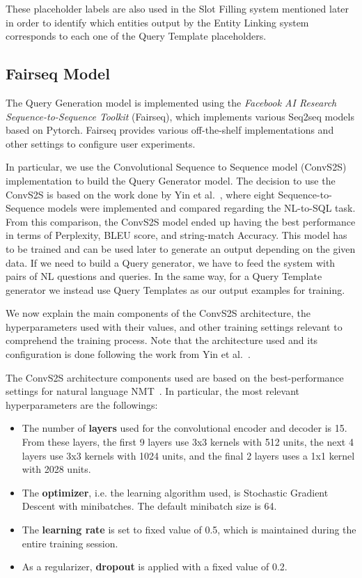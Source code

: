 These placeholder labels are also used in the Slot Filling system mentioned later in order to 
identify which entities output by the Entity Linking system corresponds to each one of the 
Query Template placeholders. 

\subsection{Fairseq Model}
\label{cap3:system/queryGenModule/fairseqModel}
The Query Generation model is implemented using the \textit{Facebook AI Research Sequence-to-Sequence 
Toolkit} (Fairseq), which implements various Seq2seq models based on Pytorch. Fairseq 
provides various off-the-shelf implementations and other settings to configure user 
experiments. 

In particular, we use the Convolutional Sequence to Sequence model (ConvS2S)~\cite{nmt:convS2S-GehringAGYD17} 
implementation to build the Query Generator model. The decision to use the ConvS2S is based 
on the work done by Yin et al.~\cite{nmt:nl-to-sparql-Yin19}, where eight Sequence-to-Sequence 
models were implemented and compared regarding the NL-to-SQL task. From this comparison, 
the ConvS2S model ended up having the best performance in terms of Perplexity, BLEU score, 
and string-match Accuracy. This model has to be trained and can be used later to generate an 
output depending on the given data. If we need to build a \SPARQL{} Query generator, we have to 
feed the system with pairs of NL questions and \SPARQL{} queries. In the same way, for a Query 
Template generator we instead use Query Templates as our output examples for training.

We now explain the main components of the ConvS2S architecture, the hyperparameters used with 
their values, and other training settings relevant to comprehend the training process. Note 
that the architecture used and its configuration is done following the work from 
Yin et al.~\cite{nmt:nl-to-sparql-Yin19}.

The ConvS2S architecture components used are based on the best-performance settings for 
natural language NMT~\cite{nmt:nl-to-sparql-Yin19}. In particular, the most relevant 
hyperparameters are the followings:

\begin{itemize}
    \item The number of \textbf{layers} used for the convolutional encoder and decoder is 15. 
    From these layers, the first 9 layers use 3x3 kernels with 512 units, the next 4 layers 
    use 3x3 kernels with 1024 units, and the final 2 layers uses a 1x1 kernel with 2028 units.
    \item The \textbf{optimizer}, i.e. the learning algorithm used, is Stochastic Gradient 
    Descent with minibatches. The default minibatch size is 64.
    \item The \textbf{learning rate} is set to fixed value of 0.5, which is maintained during 
    the entire training session.
    \item As a regularizer, \textbf{dropout} is applied with a fixed value of 0.2.
\end{itemize}

